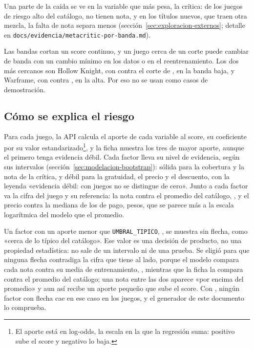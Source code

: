 Una parte de la caída se ve en la variable que más pesa, la crítica: de los \cifraAltoCatalogo{}
juegos de riesgo alto del catálogo, \cifraAltoSinNotaCatalogo{} no tienen nota, y en los títulos
nuevos, que traen otra mezcla, la falta de nota separa menos (sección~\ref{sec:exploracion-externos};
detalle en \texttt{docs/evidencia/metacritic-por-banda.md}).

Las bandas cortan un score continuo, y un juego cerca de un corte puede cambiar de banda con un
cambio mínimo en los datos o en el reentrenamiento. Los dos más cercanos son Hollow Knight, con
\cifraScoreHollowKnight{} contra el corte de \cifraUmbralMedio{}, en la banda baja, y Warframe,
con \cifraScoreWarframe{} contra \cifraUmbralAlto{}, en la alta. Por eso no se usan como casos de
demostración.

\subsection{Cómo se explica el riesgo}\label{sec:interpretabilidad}\label{sec:interpretabilidad-factores}\label{sec:interpretabilidad-avisos}

Para cada juego, la API calcula el aporte de cada variable al score, su coeficiente por su valor
estandarizado\footnote{El aporte está en log-odds, la escala en la que la regresión suma: positivo
sube el score y negativo lo baja.}, y la ficha muestra los tres de mayor aporte, aunque el primero
tenga evidencia débil. Cada factor lleva su nivel de evidencia, según sus intervalos
(sección~\ref{sec:modelacion-bootstrap}): sólida para la cobertura y la nota de la crítica, y débil
para la gratuidad, el precio y el descuento, con la leyenda «evidencia débil: con
\cifraJuegosEntrenamiento{} juegos no se distingue de cero». Junto a cada factor va la cifra del
juego y su referencia: la nota contra el promedio del catálogo, \cifraNotaPromedioCatalogo{}, y el
precio contra la mediana de los de pago, \cifraPrecioMedianoCatalogo{} pesos, que se parece más a
la escala logarítmica del modelo que el promedio.

Un factor con un aporte menor que \texttt{UMBRAL\_TIPICO}, \cifraUmbralTipico{}, se muestra sin
flecha, como «cerca de lo típico del catálogo». Ese valor es una decisión de producto, no una
propiedad estadística: no sale de un intervalo ni de una prueba. Se eligió para que ninguna flecha
contradiga la cifra que tiene al lado, porque el modelo compara cada nota contra su media de
entrenamiento, \cifraMediaNotaModelo{}, mientras que la ficha la compara contra el promedio del
catálogo; una nota entre las dos aparece «por encima del promedio» y aun así recibe un aporte
pequeño que sube el score. Con \cifraUmbralTipico{}, ningún factor con flecha cae en ese caso en
los \cifraJuegosCatalogo{} juegos, y el generador de este documento lo comprueba.

